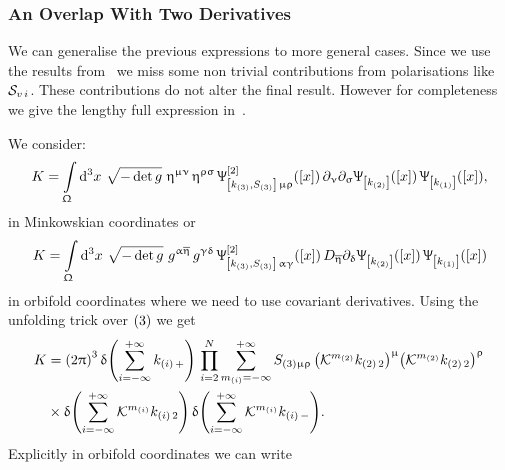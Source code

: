 \subsubsection{An Overlap With Two Derivatives}
\label{sec:overlap}

We can generalise the previous expressions to more general cases.
Since we use the results from~ we miss some non trivial contributions from polarisations like $\mathcal{S}_{v\, i}$.
These contributions do not alter the final result.
However for completeness we give the lengthy full expression in~.
  
We consider:\footnotemark{}
\begin{equation}
  K
  =
  \int\limits_{\Upomega} \dd[3]{x}\,
  \sqrt{-\det g}~
  \upeta^{\upmu\upnu}\, \upeta^{\uprho\upsigma}\,
  \Uppsi^{[2]}_{\qty[k_{\qty(3)}, S_{\qty(3)}]\, \upmu\uprho}\qty(\qty[x])\,
  \partial_{\upnu}\partial_{\upsigma} \Uppsi_{ \qty[k_{\qty(2)}] }\qty(\qty[x])\,
  \Uppsi_{ \qty[k_{\qty(1)}] }\qty(\qty[x]),
\end{equation}
in Minkowskian coordinates or
\begin{equation}
  K
  =
  \int\limits_{\Upomega} \dd[3]{x}\,
  \sqrt{-\det g}~
  g^{\upalpha\overline{\upeta}}\, g^{\upgamma\updelta}\,
  \Uppsi^{[2]}_{\qty[k_{\qty(3)}, S_{\qty(3)}]\, \upalpha\upgamma}\qty(\qty[x])\,
  D_{\overline{\upeta}} \partial_{\updelta} \Uppsi_{ \qty[k_{\qty(2)}] }\qty(\qty[x])\,
  \Uppsi_{ \qty[k_{\qty(1)}] }\qty(\qty[x])
\end{equation}
in orbifold coordinates where we need to use covariant derivatives.
Using the unfolding trick over $\qty(3)$ we get
\begin{equation}
  \begin{split}
    K
    & =
    \qty(2\uppi)^3\,
    \updelta\qty( \sum\limits_{i = -\infty}^{+\infty} k_{\qty(i)\, +} )\,
    \prod\limits_{i = 2}^{N} \sum\limits_{m_{(i)} = -\infty}^{+\infty}
    S_{\qty(3) \upmu \uprho}\,
    \qty(\mathcal{K}^{m_{\qty(2)}} k_{\qty(2)\, 2})^{\upmu}
    \qty(\mathcal{K}^{m_{\qty(2)}} k_{\qty(2)\, 2})^{\uprho}\,
    \\
    & \times
    \updelta\qty( \sum\limits_{i = -\infty}^{+\infty} \mathcal{K}^{m_{(i)}} k_{\qty(i)\, 2} )\,
    \updelta\qty( \sum\limits_{i = -\infty}^{+\infty} \mathcal{K}^{m_{(i)}} k_{\qty(i)\, -} ).
  \end{split}
  \label{eq:Spin_002_overlap_from_covering}
\end{equation}
Explicitly in orbifold coordinates we can write
